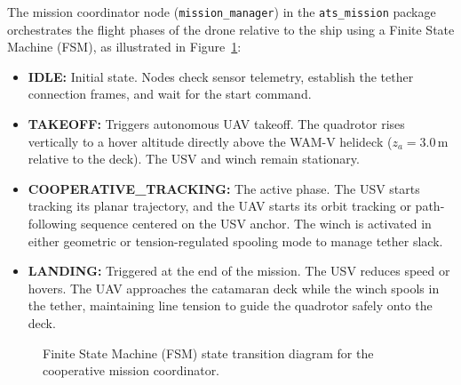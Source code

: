     The mission coordinator node (\texttt{mission\_manager}) in the \texttt{ats\_mission} package orchestrates the flight phases of the drone relative to the ship using a Finite State Machine (FSM), as illustrated in Figure~\ref{fig:mission_fsm}:
    \begin{itemize}
        \item \textbf{IDLE:} Initial state. Nodes check sensor telemetry, establish the tether connection frames, and wait for the start command.
        \item \textbf{TAKEOFF:} Triggers autonomous UAV takeoff. The quadrotor rises vertically to a hover altitude directly above the WAM-V helideck ($z_a = 3.0\,\text{m}$ relative to the deck). The USV and winch remain stationary.
        \item \textbf{COOPERATIVE\_TRACKING:} The active phase. The USV starts tracking its planar trajectory, and the UAV starts its orbit tracking or path-following sequence centered on the USV anchor. The winch is activated in either geometric or tension-regulated spooling mode to manage tether slack.
        \item \textbf{LANDING:} Triggered at the end of the mission. The USV reduces speed or hovers. The UAV approaches the catamaran deck while the winch spools in the tether, maintaining line tension to guide the quadrotor safely onto the deck.
    \end{itemize}

    \begin{figure}[H]
        \centering
        \caption{Finite State Machine (FSM) state transition diagram for the cooperative mission coordinator.}
        \label{fig:mission_fsm}
    \end{figure}
